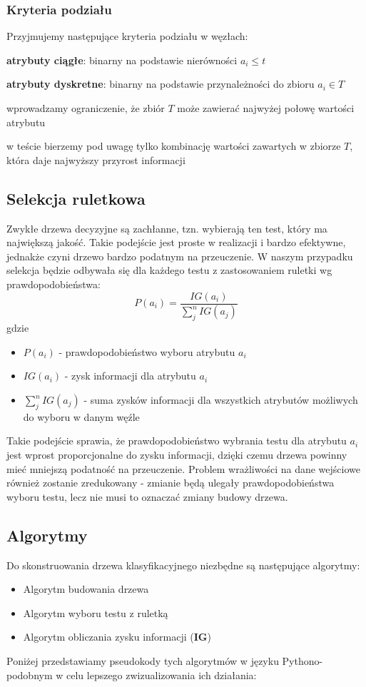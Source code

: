 \documentclass[11pt]{article}
\newcommand{\SubItem}[1]{
    {\setlength\itemindent{15pt} \item[•] #1}
}
\begin{document}
\subsubsection{Kryteria podziału}
Przyjmujemy następujące kryteria podziału w węzłach:
\begin{itemize}
\item\textbf{atrybuty ciągłe}: binarny na podstawie nierówności $a_i \le t$
\item \textbf{atrybuty dyskretne}: binarny na podstawie przynależności do zbioru $a_i \in T$
    \SubItem{wprowadzamy ograniczenie, że zbiór $T$ może zawierać najwyżej połowę wartości atrybutu}
    \SubItem{w teście bierzemy pod uwagę tylko kombinację wartości zawartych w zbiorze $T$, która daje najwyższy przyrost informacji}
\end{itemize}

\newpage
\subsection{Selekcja ruletkowa}
\label{sec:org67ac858}
Zwykłe drzewa decyzyjne są zachłanne, tzn. wybierają ten test, który ma największą jakość. Takie podejście jest proste w realizacji i bardzo efektywne, jednakże czyni drzewo bardzo podatnym na przeuczenie. W naszym przypadku selekcja będzie odbywała się dla każdego testu z zastosowaniem ruletki wg prawdopodobieństwa:
$$
        P(a_i) = \frac{IG(a_i)}{\sum_j^n{IG(a_j)}}
$$
gdzie
\begin{itemize}
\item $P(a_i)$ - prawdopodobieństwo wyboru atrybutu $a_i$
\item $IG(a_i)$ - zysk informacji dla atrybutu $a_i$
\item $\sum_j^n{IG(a_j)}$ - suma zysków informacji dla wszystkich atrybutów możliwych do wyboru w danym węźle
\end{itemize}
Takie podejście sprawia, że prawdopodobieństwo wybrania testu dla atrybutu $a_i$ jest wprost proporcjonalne do zysku informacji, dzięki czemu drzewa powinny mieć mniejszą podatność na przeuczenie. Problem wrażliwości na dane wejściowe również zostanie zredukowany - zmianie będą ulegały prawdopodobieństwa wyboru testu, lecz nie musi to oznaczać zmiany budowy drzewa.
\subsection{Algorytmy}
\label{sec:org4909e92}
Do skonstruowania drzewa klasyfikacyjnego niezbędne są następujące algorytmy:
\begin{itemize}
\item Algorytm budowania drzewa
\item Algorytm wyboru testu z ruletką
\item Algorytm obliczania zysku informacji (\textbf{IG})
\end{itemize}
Poniżej przedstawiamy pseudokody tych algorytmów w języku Pythono-podobnym w celu lepszego zwizualizowania ich działania:
\end{document}
